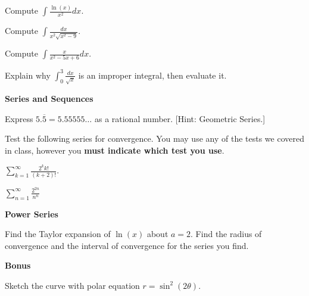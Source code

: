 \documentclass[teaching.portfolio.tex]{subfiles}
\begin{document}
\begin{thm}
  Compute $\displaystyle{\int \frac{\ln(x)}{x^2}dx}$.
\end{thm}

\begin{thm}
  Compute $\displaystyle{\int\frac{dx}{x^2\sqrt{x^2-9}}}$.
\end{thm}

\begin{thm}
  Compute $\displaystyle{\int\frac{x}{x^2 - 5x + 6}}dx$.
\end{thm}

\begin{thm}
  Explain why $\displaystyle{\int_0^3 \frac{dx}{\sqrt{x}}}$ is an improper integral, then evaluate it.
\end{thm}

\textbf{Series and Sequences}
\begin{thm}
  Express $5.\overline{5} = 5.55555\ldots$ as a rational number. [Hint: Geometric Series.]
\end{thm}

\noindent
Test the following series for convergence.
You may use any of the tests we covered in class, however you {\bf must indicate which test you use}.
\begin{thm}
  $\displaystyle{\sum_{k=1}^\infty \frac{2^k k!}{(k+2)!}}.$
\end{thm}

\begin{thm}
  $\displaystyle{\sum_{n=1}^\infty \frac{2^{2n}}{n^n}}$
\end{thm}

\textbf{Power Series}

\begin{thm}
  Find the Taylor expansion of $\ln(x)$ about $a = 2$.
  Find the radius of convergence and the interval of convergence for the series you find.
\end{thm}

\textbf{Bonus}

\begin{thm}
  Sketch the curve with polar equation $\displaystyle{r = \sin^2(2\theta)}$.
\end{thm}
\end{document}
